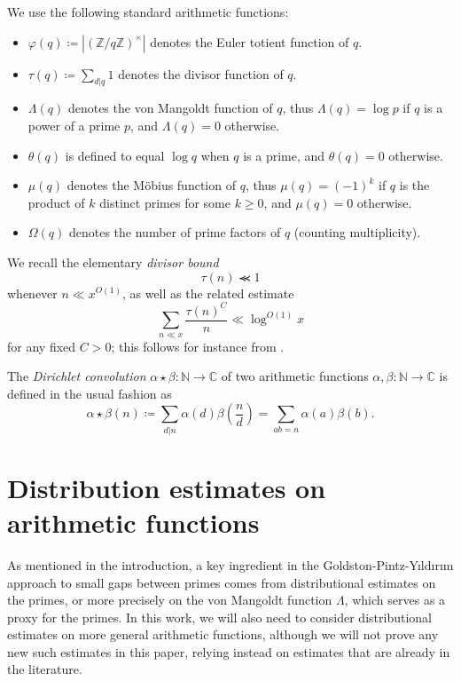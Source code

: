 \documentclass{bmcart}
\theoremstyle{plain}
\theoremstyle{definition}
\newcommand\Z{\mathbb{Z}}
\newcommand\N{\mathbb{N}}
\newcommand\C{\mathbb{C}}
\renewcommand{\lessapprox}{\llcurly}
\renewcommand{\phi}{\varphi}
\begin{document}
We use the following standard arithmetic functions:
\begin{itemize}
\item[(i)] $\phi(q) \coloneqq |(\Z/q\Z)^\times|$ denotes the Euler totient function of $q$.
\item[(ii)] $\tau(q) \coloneqq \sum_{d|q} 1$ denotes the divisor function of $q$.
\item[(iii)] $\Lambda(q)$ denotes the von Mangoldt function of $q$, thus $\Lambda(q)=\log p$ if $q$ is a power of a prime $p$, and $\Lambda(q)=0$ otherwise.
\item[(iv)] $\theta(q)$ is defined to equal $\log q$ when $q$ is a prime, and $\theta(q)=0$ otherwise.
\item[(v)] $\mu(q)$ denotes the M\"obius function of $q$, thus $\mu(q) = (-1)^k$ if $q$ is the product of $k$ distinct primes for some $k \geq 0$, and $\mu(q)=0$ otherwise.
\item[(vi)] $\Omega(q)$ denotes the number of prime factors of $q$ (counting multiplicity).
\end{itemize}

We recall the elementary \emph{divisor bound}
\begin{equation}\label{divisor-bound}
\tau(n) \lessapprox 1
\end{equation}
whenever $n \ll x^{O(1)}$, as well as the related estimate
\begin{equation}\label{divisor-2}
\sum_{n \ll x} \frac{\tau(n)^C}{n} \ll \log^{O(1)} x
\end{equation}
for any fixed $C>0$; this follows for instance from \cite[Lemma 1.3]{polymath8a}.

The \emph{Dirichlet convolution} $\alpha \star \beta \colon \N \to \C$
of two arithmetic functions $\alpha,\beta \colon \N \to \C$ is defined
in the usual fashion as
$$ \alpha\star\beta(n) \coloneqq \sum_{d|n} \alpha(d)
\beta\left(\frac{n}{d}\right) =\sum_{ab=n}{\alpha(a)\beta(b)}.$$

\section{Distribution estimates on arithmetic functions}\label{dist-sec}

As mentioned in the introduction, a key ingredient in the Goldston-Pintz-Y{\i}ld{\i}r{\i}m approach to small gaps between primes comes from distributional estimates on the primes, or more precisely on the von Mangoldt function $\Lambda$, which serves as a proxy for the primes.  In this work, we will also need to consider distributional estimates on more general arithmetic functions, although we will not prove any new such estimates in this paper, relying instead on estimates that are already in the literature.  
\end{document}
